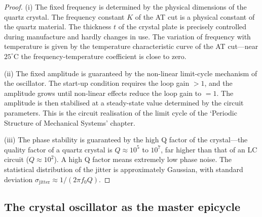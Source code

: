\begin{proof}
(i) The fixed frequency is determined by the physical dimensions of the quartz crystal. The frequency constant $K$ of the AT cut is a physical constant of the quartz material. The thickness $t$ of the crystal plate is precisely controlled during manufacture and hardly changes in use. The variation of frequency with temperature is given by the temperature characteristic curve of the AT cut---near $25^\circ$C the frequency-temperature coefficient is close to zero.

(ii) The fixed amplitude is guaranteed by the non-linear limit-cycle mechanism of the oscillator. The start-up condition requires the loop gain $> 1$, and the amplitude grows until non-linear effects reduce the loop gain to $= 1$. The amplitude is then stabilised at a steady-state value determined by the circuit parameters. This is the circuit realisation of the limit cycle of the `Periodic Structure of Mechanical Systems' chapter.

(iii) The phase stability is guaranteed by the high Q factor of the crystal---the quality factor of a quartz crystal is $Q \approx 10^5$ to $10^7$, far higher than that of an LC circuit ($Q \approx 10^2$). A high Q factor means extremely low phase noise. The statistical distribution of the jitter is approximately Gaussian, with standard deviation $\sigma_{\text{jitter}} \approx 1/(2\pi f_0 Q)$.
\end{proof}

\subsection{The crystal oscillator as the master epicycle}

